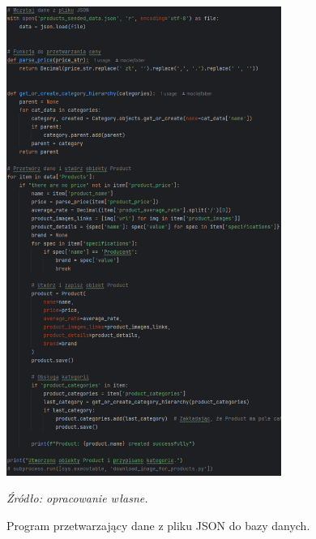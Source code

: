 \documentclass[12pt,a4paper,oneside]{article}
\theoremstyle{definition}
\numberwithin{equation}{section}
\begin{document}
\begin{figure}[H]
    \centering
    \includegraphics[width=0.8\textwidth]{images/krzysztofBImages/product_seed_to_database.png}
    \caption{Program przetwarzający dane z pliku JSON do bazy danych.}
    \emph{Źródło: opracowanie własne.}
    \label{fig:json_import}
\end{figure}
%
%
\end{document}

